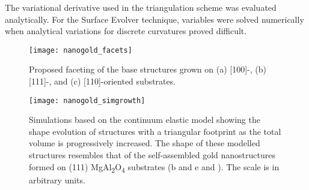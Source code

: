 The variational derivative used in the triangulation scheme was evaluated analytically.
For the Surface Evolver technique, variables were solved numerically when analytical variations for discrete curvatures proved difficult.
\begin{figure}
 \centering \texttt{[image: nanogold\_facets]}
 \caption[Model of gold nanostructure faceting]{\label{fig:nanogold_facets}Proposed faceting of the base structures grown on (a) [100]-, (b) [111]-, and (c) [110]-oriented substrates.}
\end{figure}
\begin{figure}
 \centering \texttt{[image: nanogold\_simgrowth]}
 \caption[Simulated gold nanostructure growth]{\label{fig:nanogold_simgrowth}Simulations based on the continuum elastic model showing the shape evolution of structures with a triangular footprint as the total volume is progressively increased.
  The shape of these modelled structures resembles that of the self-assembled gold nanostructures formed on (111) MgAl\textsubscript{2}O\textsubscript{4} substrates (b and e and ).
  The scale is in arbitrary units.}
\end{figure}

